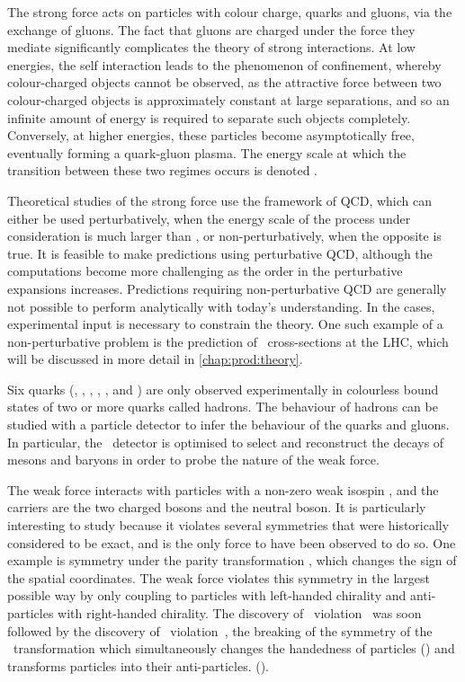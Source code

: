 The strong force acts on particles with colour charge, quarks and gluons, via 
the exchange of gluons.
The fact that gluons are charged under the force they mediate significantly 
complicates the theory of strong interactions.
At low energies, the self interaction leads to the phenomenon of confinement, 
whereby colour-charged objects cannot be observed, as the attractive force 
between two colour-charged objects is approximately constant at large 
separations, and so an infinite amount of energy is required to separate such 
objects completely.
Conversely, at higher energies, these particles become asymptotically free, 
eventually forming a quark-gluon plasma.
The energy scale at which the transition between these two regimes occurs is 
denoted \qcdscale.

Theoretical studies of the strong force use the framework of \ac{QCD}, which 
can either be used perturbatively, when the energy scale of the process under 
consideration is much larger than \qcdscale, or non-perturbatively, when the 
opposite is true.
It is feasible to make predictions using perturbative \ac{QCD}, although the 
computations become more challenging as the order in the perturbative 
expansions increases.
Predictions requiring non-perturbative \ac{QCD} are generally not possible to 
perform analytically with today's understanding.
In the cases, experimental input is necessary to constrain the theory.
One such example of a non-perturbative problem is the prediction of \pp\ 
cross-sections at the \ac{LHC}, which will be discussed in more detail in 
\cref{chap:prod:theory}.

Six quarks (\Pup, \Pdown, \Pcharm, \Pstrange, \Ptop, and \Pbottom) are only 
observed experimentally in colourless bound states of two or more quarks called 
hadrons.
The behaviour of hadrons can be studied with a particle detector to infer the 
behaviour of the quarks and gluons.
In particular, the \lhcb\ detector is optimised to select and reconstruct the 
decays of mesons and baryons in order to probe the nature of the weak force.

The weak force interacts with particles with a non-zero weak isospin \wisospin, 
and the carriers are the two charged \PWpm bosons and the neutral \PZ boson.
It is particularly interesting to study because it violates several symmetries 
that were historically considered to be exact, and is the only force to have 
been observed to do so.
One example is symmetry under the parity transformation \Ptransform, which 
changes the sign of the spatial coordinates.
The weak force violates this symmetry in the largest possible way by only 
coupling to particles with left-handed chirality and anti-particles with 
right-handed chirality.
The discovery of \Ptransform\ violation~\cite{Wu:1957my} was soon followed by 
the discovery of \CP\ violation~\cite{Christenson:1964fg}, the breaking of the 
symmetry of the \CP\ transformation which simultaneously changes the handedness 
of particles (\Ptransform) and transforms particles into their anti-particles.  
(\Ctransform).

